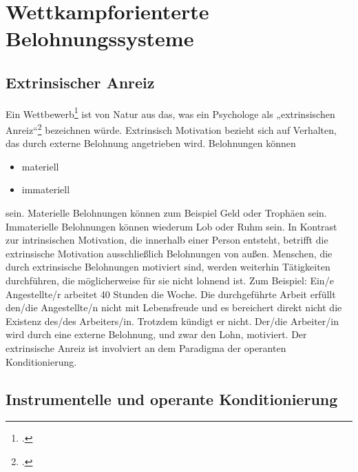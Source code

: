 \chapter{Wettkampforienterte Belohnungssysteme}
\reiter
\section{Extrinsischer Anreiz}	
Ein Wettbewerb\footcite{competition-psychology} ist von Natur aus das, was ein Psychologe als „extrinsischen Anreiz“\footcite{extrinsic-motivation} bezeichnen würde.
Extrinsisch Motivation bezieht sich auf Verhalten, das durch externe Belohnung angetrieben wird. Belohnungen können  
\begin{itemize}
	\item materiell
	\item immateriell
\end{itemize}	
sein. Materielle Belohnungen können zum Beispiel Geld oder Trophäen sein. Immaterielle Belohnungen können wiederum Lob oder Ruhm sein. In Kontrast zur intrinsischen Motivation, die innerhalb einer Person entsteht, betrifft die extrinsische Motivation ausschließlich Belohnungen von außen. 
Menschen, die durch extrinsische Belohnungen motiviert sind, werden weiterhin Tätigkeiten durchführen, die möglicherweise für sie nicht lohnend ist. 
Zum Beispiel: Ein/e Angestellte/r arbeitet 40 Stunden die Woche. Die durchgeführte Arbeit erfüllt den/die Angestellte/n nicht mit Lebensfreude und es bereichert direkt nicht die Existenz des/des Arbeiters/in. Trotzdem kündigt er nicht. Der/die Arbeiter/in wird durch eine externe Belohnung, und zwar den Lohn, motiviert. 
Der extrinsische Anreiz ist involviert an dem Paradigma der operanten Konditionierung.
\newpage
\section{Instrumentelle und operante Konditionierung}
